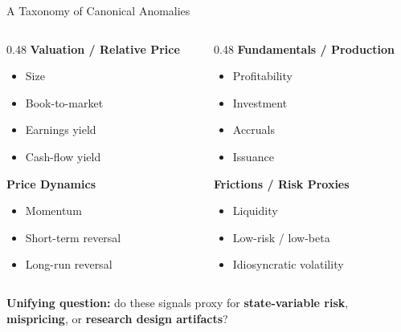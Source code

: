 \documentclass{beamer}
\begin{document}
\begin{frame}{A Taxonomy of Canonical Anomalies}
	\begin{columns}[t]
		\begin{column}{0.48\textwidth}
			\textbf{Valuation / Relative Price}
			\begin{itemize}
				\item Size
				\item Book-to-market
				\item Earnings yield
				\item Cash-flow yield
			\end{itemize}

			\textbf{Price Dynamics}
			\begin{itemize}
				\item Momentum
				\item Short-term reversal
				\item Long-run reversal
			\end{itemize}
		\end{column}
		\begin{column}{0.48\textwidth}
			\textbf{Fundamentals / Production}
			\begin{itemize}
				\item Profitability
				\item Investment
				\item Accruals
				\item Issuance
			\end{itemize}

			\textbf{Frictions / Risk Proxies}
			\begin{itemize}
				\item Liquidity
				\item Low-risk / low-beta
				\item Idiosyncratic volatility
			\end{itemize}
		\end{column}
	\end{columns}

	\vspace{0.4cm}
	\textbf{Unifying question:} do these signals proxy for \textbf{state-variable risk}, \textbf{mispricing}, or \textbf{research design artifacts}?
\end{frame}
\end{document}
